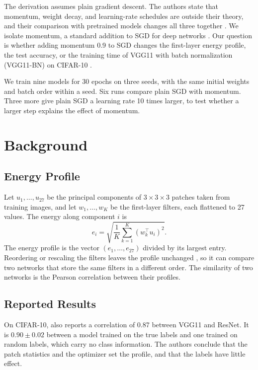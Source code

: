 \documentclass[conference]{IEEEtran}
\begin{document}
The derivation assumes plain gradient descent. The authors state that
momentum, weight decay, and learning-rate schedules are outside their theory,
and their comparison with pretrained models changes all three together
\cite{chowers2023}. We isolate momentum, a standard addition to SGD for deep
networks \cite{sutskever2013}. Our question is whether adding momentum 0.9 to
SGD
changes the first-layer energy profile, the test accuracy, or the training
time of VGG11 with batch normalization (VGG11-BN)
\cite{simonyan2015,ioffe2015} on CIFAR-10 \cite{krizhevsky2009}.

We train nine models for 30 epochs on three seeds, with the same initial
weights and batch order within a seed. Six runs compare plain SGD with
momentum. Three more give plain SGD a learning rate 10 times larger, to test
whether a larger step explains the effect of momentum.

\section{Background}
\subsection{Energy Profile}
Let $u_1,\dots,u_{27}$ be the principal components of $3\times3\times3$
patches taken from training images, and let $w_1,\dots,w_K$ be the first-layer
filters, each flattened to 27 values. The energy along component $i$ is
\begin{equation}
e_i = \sqrt{\frac{1}{K}\sum_{k=1}^{K}\left(w_k^{\top}u_i\right)^2}.
\label{eq:energy}
\end{equation}
The energy profile is the vector $(e_1,\dots,e_{27})$ divided by its largest
entry. Reordering or rescaling the filters leaves the profile unchanged
\cite{chowers2023}, so it can compare two networks that store the same filters
in a different order. The similarity of two networks is the Pearson
correlation between their profiles.

\subsection{Reported Results}
On CIFAR-10, \cite{chowers2023} also reports a correlation of 0.87 between
VGG11 and ResNet. It is $0.90\pm0.02$ between a model trained on the true
labels and one trained on random labels, which carry no class information. The
authors conclude that the patch statistics and the optimizer set the profile,
and that the labels have little effect.
\end{document}
